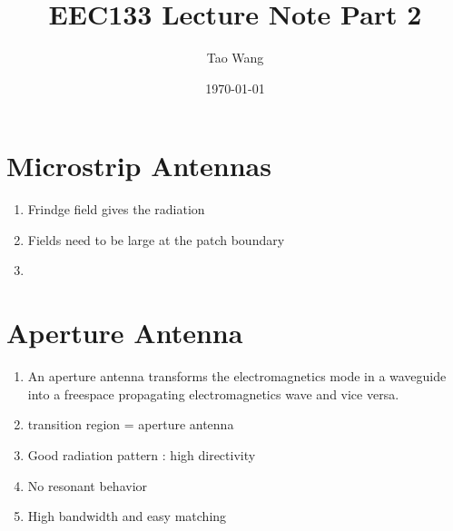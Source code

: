 \documentclass{article} %
\begin{document}
\title{EEC133 Lecture Note Part 2}
\author{Tao Wang}
\date{\today}

\maketitle

\section{Microstrip Antennas}
\begin{enumerate}
    \item Frindge field gives the radiation
    \item Fields need to be large at the patch boundary
    \item
\end{enumerate}

\section{Aperture Antenna}
\begin{enumerate}
    \item  An aperture antenna transforms the electromagnetics mode in a waveguide into a freespace propagating electromagnetics wave and vice versa.
    \item transition region = aperture antenna
    \item Good radiation pattern : high directivity
    \item No resonant behavior
    \item High bandwidth and easy matching
\end{enumerate}
\end{document}
